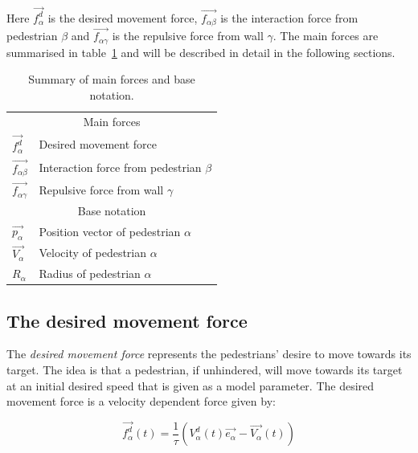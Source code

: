 Here $\overrightarrow{f_{\alpha}^{d}}$ is the desired movement force,
$\overrightarrow{f_{\alpha \beta}}$ is the interaction force from pedestrian
$\beta$ and $\overrightarrow{f_{\alpha \gamma}}$ is the repulsive force from
wall $\gamma$. The main forces are summarised in table~\ref{tbl:main-forces}
and will be described in detail in the following sections.

\begin{table}[h]
    \centering
    \begin{tabular}{l l}
        \toprule
        \multicolumn{2}{c}{\textsf{Main forces}}\\
        $\overrightarrow{f_{\alpha}^{d}}$ & Desired movement force\\
        $\overrightarrow{f_{\alpha \beta}}$ & Interaction force from pedestrian
        $\beta$\\
        $\overrightarrow{f_{\alpha \gamma}}$ & Repulsive force from wall
        $\gamma$\\
        \midrule
        \multicolumn{2}{c}{\textsf{Base notation}}\\
        $\overrightarrow{p_{\alpha}}$ & Position vector of pedestrian
        $\alpha$\\
        $\overrightarrow{V_{\alpha}}$ & Velocity of pedestrian $\alpha$ \\
        \addlinespace[0.3em]
        $R_\alpha$ & Radius of pedestrian $\alpha$\\
        \bottomrule
    \end{tabular}
    \caption{Summary of main forces and base notation.}
    \label{tbl:main-forces}
\end{table}

\subsection{The desired movement force}
\label{sec:desired-force}
The \emph{desired movement force} represents the pedestrians' desire to move towards its
target. The idea is that a pedestrian, if unhindered, will move towards its
target at an initial desired speed that is given as a model parameter. The
desired movement force is a velocity dependent force given by:

\begin{equation}\label{eqn:desired-force}
	\overrightarrow{f^{d}_{\alpha}} (t) =
    \frac{1}{\tau}
    \left( V_{\alpha}^{d}(t) \overrightarrow{e_{\alpha}} -
    \overrightarrow{V_{\alpha}}(t) \right)
\end{equation}

